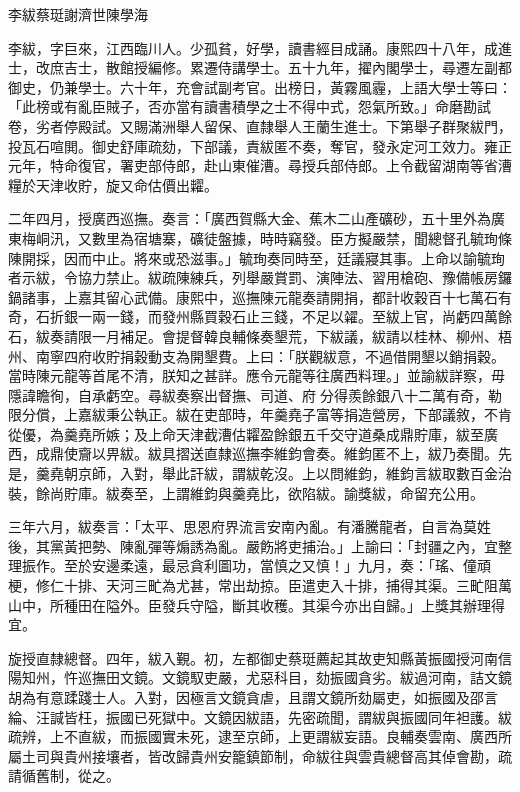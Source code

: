 
\begin{pinyinscope}
李紱蔡珽謝濟世陳學海

李紱，字巨來，江西臨川人。少孤貧，好學，讀書經目成誦。康熙四十八年，成進士，改庶吉士，散館授編修。累遷侍講學士。五十九年，擢內閣學士，尋遷左副都御史，仍兼學士。六十年，充會試副考官。出榜日，黃霧風霾，上語大學士等曰：「此榜或有亂臣賊子，否亦當有讀書積學之士不得中式，怨氣所致。」命磨勘試卷，劣者停殿試。又賜滿洲舉人留保、直隸舉人王蘭生進士。下第舉子群聚紱門，投瓦石喧閧。御史舒庫疏劾，下部議，責紱匿不奏，奪官，發永定河工效力。雍正元年，特命復官，署吏部侍郎，赴山東催漕。尋授兵部侍郎。上令截留湖南等省漕糧於天津收貯，旋又命估價出糶。

二年四月，授廣西巡撫。奏言：「廣西賀縣大金、蕉木二山產礦砂，五十里外為廣東梅峒汛，又數里為宿塘寨，礦徒盤據，時時竊發。臣方擬嚴禁，聞總督孔毓珣條陳開採，因而中止。將來或恐滋事。」毓珣奏同時至，廷議寢其事。上命以諭毓珣者示紱，令協力禁止。紱疏陳練兵，列舉嚴賞罰、演陣法、習用槍砲、豫備帳房鑼鍋諸事，上嘉其留心武備。康熙中，巡撫陳元龍奏請開捐，都計收穀百十七萬石有奇，石折銀一兩一錢，而發州縣買穀石止三錢，不足以糴。至紱上官，尚虧四萬餘石，紱奏請限一月補足。會提督韓良輔條奏墾荒，下紱議，紱請以桂林、柳州、梧州、南寧四府收貯捐穀動支為開墾費。上曰：「朕觀紱意，不過借開墾以銷捐穀。當時陳元龍等首尾不清，朕知之甚詳。應令元龍等往廣西料理。」並諭紱詳察，毋隱諱瞻徇，自承虧空。尋紱奏察出督撫、司道、府分得羨餘銀八十二萬有奇，勒限分償，上嘉紱秉公執正。紱在吏部時，年羹堯子富等捐造營房，下部議敘，不肯從優，為羹堯所嫉；及上命天津截漕估糶盈餘銀五千交守道桑成鼎貯庫，紱至廣西，成鼎使齎以畀紱。紱具摺送直隸巡撫李維鈞會奏。維鈞匿不上，紱乃奏聞。先是，羹堯朝京師，入對，舉此訐紱，謂紱乾沒。上以問維鈞，維鈞言紱取數百金治裝，餘尚貯庫。紱奏至，上謂維鈞與羹堯比，欲陷紱。諭獎紱，命留充公用。

三年六月，紱奏言：「太平、思恩府界流言安南內亂。有潘騰龍者，自言為莫姓後，其黨黃把勢、陳亂彈等煽誘為亂。嚴飭將吏捕治。」上諭曰：「封疆之內，宜整理振作。至於安邊柔遠，最忌貪利圖功，當慎之又慎！」九月，奏：「瑤、僮頑梗，修仁十排、天河三甿為尤甚，常出劫掠。臣遣吏入十排，捕得其渠。三甿阻萬山中，所種田在隘外。臣發兵守隘，斷其收穫。其渠今亦出自歸。」上獎其辦理得宜。

旋授直隸總督。四年，紱入覲。初，左都御史蔡珽薦起其故吏知縣黃振國授河南信陽知州，忤巡撫田文鏡。文鏡馭吏嚴，尤惡科目，劾振國貪劣。紱過河南，詰文鏡胡為有意蹂踐士人。入對，因極言文鏡貪虐，且謂文鏡所劾屬吏，如振國及邵言綸、汪諴皆枉，振國已死獄中。文鏡因紱語，先密疏聞，謂紱與振國同年袒護。紱疏辨，上不直紱，而振國實未死，逮至京師，上更謂紱妄語。良輔奏雲南、廣西所屬土司與貴州接壤者，皆改歸貴州安籠鎮節制，命紱往與雲貴總督高其倬會勘，疏請循舊制，從之。


\end{pinyinscope}
